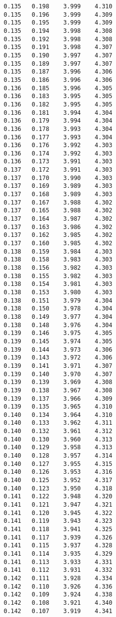 \begin{verbatim}
   0.135   0.198    3.999    4.310
   0.135   0.196    3.999    4.309
   0.135   0.195    3.999    4.309
   0.135   0.194    3.998    4.308
   0.135   0.192    3.998    4.308
   0.135   0.191    3.998    4.307
   0.135   0.190    3.997    4.307
   0.135   0.189    3.997    4.307
   0.135   0.187    3.996    4.306
   0.135   0.186    3.996    4.306
   0.136   0.185    3.996    4.305
   0.136   0.183    3.995    4.305
   0.136   0.182    3.995    4.305
   0.136   0.181    3.994    4.304
   0.136   0.179    3.994    4.304
   0.136   0.178    3.993    4.304
   0.136   0.177    3.993    4.304
   0.136   0.176    3.992    4.303
   0.136   0.174    3.992    4.303
   0.136   0.173    3.991    4.303
   0.137   0.172    3.991    4.303
   0.137   0.170    3.990    4.303
   0.137   0.169    3.989    4.303
   0.137   0.168    3.989    4.303
   0.137   0.167    3.988    4.302
   0.137   0.165    3.988    4.302
   0.137   0.164    3.987    4.302
   0.137   0.163    3.986    4.302
   0.137   0.162    3.985    4.302
   0.137   0.160    3.985    4.302
   0.138   0.159    3.984    4.303
   0.138   0.158    3.983    4.303
   0.138   0.156    3.982    4.303
   0.138   0.155    3.982    4.303
   0.138   0.154    3.981    4.303
   0.138   0.153    3.980    4.303
   0.138   0.151    3.979    4.304
   0.138   0.150    3.978    4.304
   0.138   0.149    3.977    4.304
   0.138   0.148    3.976    4.304
   0.139   0.146    3.975    4.305
   0.139   0.145    3.974    4.305
   0.139   0.144    3.973    4.306
   0.139   0.143    3.972    4.306
   0.139   0.141    3.971    4.307
   0.139   0.140    3.970    4.307
   0.139   0.139    3.969    4.308
   0.139   0.138    3.967    4.308
   0.139   0.137    3.966    4.309
   0.139   0.135    3.965    4.310
   0.140   0.134    3.964    4.310
   0.140   0.133    3.962    4.311
   0.140   0.132    3.961    4.312
   0.140   0.130    3.960    4.313
   0.140   0.129    3.958    4.313
   0.140   0.128    3.957    4.314
   0.140   0.127    3.955    4.315
   0.140   0.126    3.953    4.316
   0.140   0.125    3.952    4.317
   0.140   0.123    3.950    4.318
   0.141   0.122    3.948    4.320
   0.141   0.121    3.947    4.321
   0.141   0.120    3.945    4.322
   0.141   0.119    3.943    4.323
   0.141   0.118    3.941    4.325
   0.141   0.117    3.939    4.326
   0.141   0.115    3.937    4.328
   0.141   0.114    3.935    4.329
   0.141   0.113    3.933    4.331
   0.141   0.112    3.931    4.332
   0.142   0.111    3.928    4.334
   0.142   0.110    3.926    4.336
   0.142   0.109    3.924    4.338
   0.142   0.108    3.921    4.340
   0.142   0.107    3.919    4.341

\end{verbatim}
